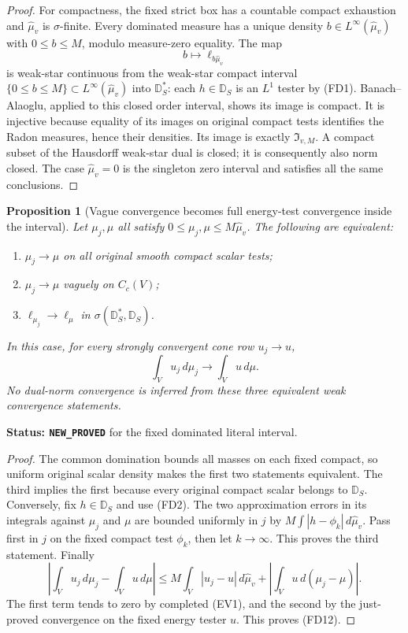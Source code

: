 \documentclass[11pt,a4paper]{article}
\numberwithin{equation}{section}
\newtheorem{proposition}[theorem]{Proposition}
\theoremstyle{definition}
\theoremstyle{remark}
\begin{document}
\begin{proof}
For compactness, the fixed strict box has a countable compact
exhaustion and $\widehat\mu_v$ is $\sigma$-finite. Every dominated
measure has a unique density $b\in L^\infty(\widehat\mu_v)$
with $0\leq b\leq M$, modulo measure-zero equality. The map
\[
 b\longmapsto \ell_{b\widehat\mu_v}
 \tag{FD11}
\]
is weak-star continuous from the weak-star compact interval
$\{0\leq b\leq M\}\subset L^\infty(\widehat\mu_v)$ into
$\mathbb D_S^*$: each $h\in\mathbb D_S$ is an $L^1$ tester
by \textup{(FD1)}. Banach--Alaoglu, applied to this closed order
interval, shows its image is compact. It is injective because
equality of its images on original compact tests identifies
the Radon measures, hence their densities. Its image is exactly
$\mathfrak I_{v,M}$. A compact subset of the Hausdorff weak-star
dual is closed; it is consequently also norm closed. The case
$\widehat\mu_v=0$ is the singleton zero interval and satisfies
all the same conclusions.
\end{proof}

\begin{proposition}[Vague convergence becomes full energy-test convergence inside the interval]
\label{prop:r12-fixed-domination-moving-testers}
Let $\mu_j,\mu$ all satisfy
$0\leq\mu_j,\mu\leq M\widehat\mu_v$. The following are
equivalent:
\begin{enumerate}
\item $\mu_j\to\mu$ on all original smooth compact scalar tests;
\item $\mu_j\to\mu$ vaguely on $C_c(V)$;
\item $\ell_{\mu_j}\to\ell_\mu$ in
$\sigma(\mathbb D_S^*,\mathbb D_S)$.
\end{enumerate}
In this case, for every strongly convergent cone row $u_j\to u$,
\[
                  \int_Vu_j\,d\mu_j
                         \longrightarrow\int_Vu\,d\mu.
 \tag{FD12}
\]
No dual-norm convergence is inferred from these three equivalent
weak convergence statements.
\end{proposition}

\noindent\textbf{Status: \texttt{NEW\_PROVED}} for the
fixed dominated literal interval.

\begin{proof}
The common domination bounds all masses on each fixed compact,
so uniform original scalar density makes the first two statements
equivalent. The third implies the first because every original
compact scalar belongs to $\mathbb D_S$.
Conversely, fix $h\in\mathbb D_S$ and use \textup{(FD2)}.
The two approximation errors in its integrals against $\mu_j$
and $\mu$ are bounded uniformly in $j$ by
$M\int|h-\phi_k|\,d\widehat\mu_v$. Pass first in $j$ on the
fixed compact test $\phi_k$, then let $k\to\infty$.
This proves the third statement. Finally
\[
 \left|\int_Vu_j\,d\mu_j-\int_Vu\,d\mu\right|
 \leq M\int_V|u_j-u|\,d\widehat\mu_v
         +\left|\int_Vu\,d(\mu_j-\mu)\right|.
\]
The first term tends to zero by completed \textup{(EV1)}, and
the second by the just-proved convergence on the fixed energy
tester $u$. This proves \textup{(FD12)}.
\end{proof}
\end{document}
